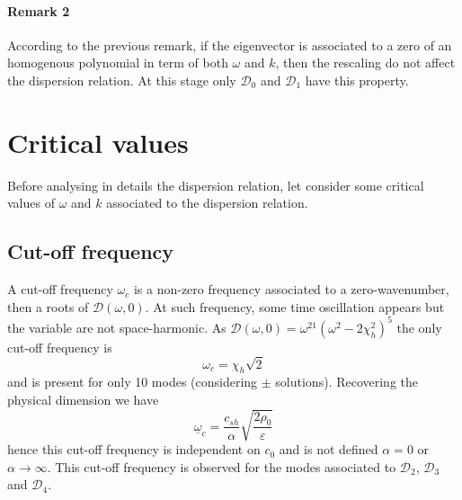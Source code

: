 \documentclass[
10pt, %
a4paper, %
oneside, %
headinclude,footinclude, %
table
]{scrartcl}
\begin{document}
\paragraph{\textbf{Remark 2}} According to the previous remark, if the eigenvector is associated to a zero of an homogenous polynomial in term of both $\omega$ and $k$, then  the rescaling do not affect the dispersion relation. At this stage only $\mathcal{D}_{0}$ and $\mathcal{D}_{1}$ have this property. 

\section{Critical values}
Before analysing in details the dispersion relation, let consider some critical values of $\omega$ and $k$ associated to the dispersion relation.
\subsection{Cut-off frequency}
A cut-off frequency $\omega_{c}$ is a non-zero frequency associated to a zero-wavenumber, then a roots of $\mathcal{D}(\omega,0)$. At such frequency, some time oscillation appears but the variable are not space-harmonic. As $\mathcal{D}(\omega,0)=\omega^{21}(\omega^2-2 \chi_{h}^2)^5$ the only cut-off frequency is 
$$
\boxed{\omega_{c}=\chi_{h}\sqrt{2}}
$$
 and is present for only 10 modes (considering $\pm$ solutions). Recovering the physical dimension we have
 $$
\underline{\omega}_{c}=\frac{c_{sh}}{\alpha} \sqrt{\frac{2\rho_{0}}{\varepsilon}}
 $$
 hence this cut-off frequency is independent on $c_{0}$ and is not defined $\alpha=0$ or $\alpha\to\infty$. This cut-off frequency is observed for the modes associated to $\mathcal{D}_{2}$, $\mathcal{D}_{3}$ and $\mathcal{D}_{4}$.
 
\end{document}
